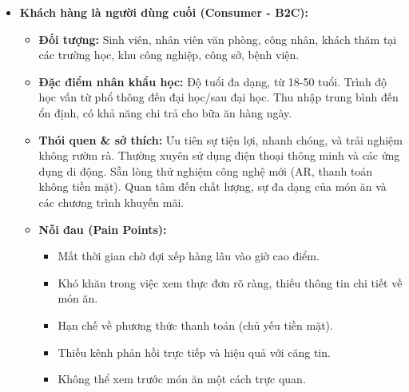 \documentclass[12pt,a4paper]{article}
\begin{document}
\begin{itemize}[label=\textbullet]
    \item \textbf{Khách hàng là người dùng cuối (Consumer - B2C):}
    \begin{itemize}[label=\textendash]
        \item \textbf{Đối tượng:} Sinh viên, nhân viên văn phòng, công nhân, khách thăm tại các trường học, khu công nghiệp, công sở, bệnh viện.
        \item \textbf{Đặc điểm nhân khẩu học:} Độ tuổi đa dạng, từ 18-50 tuổi. Trình độ học vấn từ phổ thông đến đại học/sau đại học. Thu nhập trung bình đến ổn định, có khả năng chi trả cho bữa ăn hàng ngày.
        \item \textbf{Thói quen \& sở thích:} Ưu tiên sự tiện lợi, nhanh chóng, và trải nghiệm không rườm rà. Thường xuyên sử dụng điện thoại thông minh và các ứng dụng di động. Sẵn lòng thử nghiệm công nghệ mới (AR, thanh toán không tiền mặt). Quan tâm đến chất lượng, sự đa dạng của món ăn và các chương trình khuyến mãi.
        \item \textbf{Nỗi đau (Pain Points):}
        \begin{itemize}[label=\textrightarrow]
            \item Mất thời gian chờ đợi xếp hàng lâu vào giờ cao điểm.
            \item Khó khăn trong việc xem thực đơn rõ ràng, thiếu thông tin chi tiết về món ăn.
            \item Hạn chế về phương thức thanh toán (chủ yếu tiền mặt).
            \item Thiếu kênh phản hồi trực tiếp và hiệu quả với căng tin.
            \item Không thể xem trước món ăn một cách trực quan.
        \end{itemize}
    \end{itemize}


\end{itemize}
\end{document}
